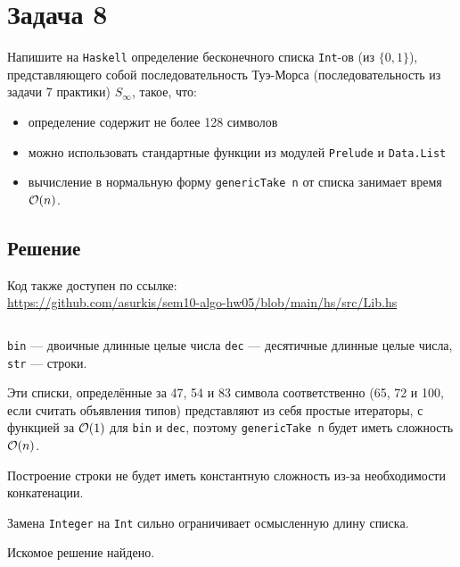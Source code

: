 \section{Задача 8}
Напишите на \texttt{Haskell} определение бесконечного списка
\texttt{Int}-ов (из $\{ 0, 1 \}$), представляющего собой последовательность
Туэ-Морса (последовательность из задачи 7 практики) $S_\infty$, такое, что:
\begin{itemize}
\item определение содержит не более 128 символов
\item можно использовать стандартные функции из модулей \texttt{Prelude} и \texttt{Data.List}
\item вычисление в нормальную форму \texttt{genericTake n} от списка занимает время $\mathcal{O}(n)$.
\end{itemize}

\subsection{Решение}
Код также доступен по ссылке:\\
\url{https://github.com/asurkis/sem10-algo-hw05/blob/main/hs/src/Lib.hs}

\inputminted{Haskell}{hs/src/Lib.hs}

\texttt{bin} --- двоичные длинные целые числа
\texttt{dec} --- десятичные длинные целые числа,
\texttt{str} --- строки.

Эти списки, определённые за 47, 54 и 83 символа соответственно
(65, 72 и 100, если считать объявления типов)
представляют из себя простые итераторы, с функцией за $\mathcal{O}(1)$ для \texttt{bin} и \texttt{dec},
поэтому \texttt{genericTake n} будет иметь сложность $\mathcal{O}(n)$.

Построение строки не будет иметь константную сложность из-за необходимости конкатенации.

Замена \texttt{Integer} на \texttt{Int} сильно ограничивает осмысленную длину списка.

Искомое решение найдено.
